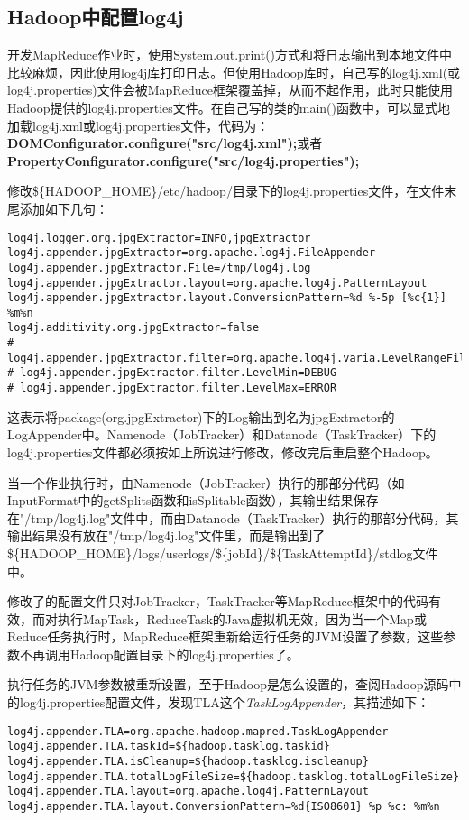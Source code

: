 \subsection{Hadoop中配置log4j}
开发MapReduce作业时，使用System.out.print()方式和将日志输出到本地文件中比较麻烦，因此使用log4j库打印日志。但使用Hadoop库时，自己写的log4j.xml(或log4j.properties)文件会被MapReduce框架覆盖掉，从而不起作用，此时只能使用Hadoop提供的log4j.properties文件。在自己写的类的main()函数中，可以显式地加载log4j.xml或log4j.properties文件，代码为：\textbf{DOMConfigurator.configure("src/log4j.xml");}或者\textbf{PropertyConfigurator.configure("src/log4j.properties");}
\par 修改\$\{HADOOP\_HOME\}/etc/hadoop/目录下的log4j.properties文件，在文件末尾添加如下几句：
\begin{verbatim}
log4j.logger.org.jpgExtractor=INFO,jpgExtractor
log4j.appender.jpgExtractor=org.apache.log4j.FileAppender
log4j.appender.jpgExtractor.File=/tmp/log4j.log
log4j.appender.jpgExtractor.layout=org.apache.log4j.PatternLayout
log4j.appender.jpgExtractor.layout.ConversionPattern=%d %-5p [%c{1}] %m%n
log4j.additivity.org.jpgExtractor=false
# log4j.appender.jpgExtractor.filter=org.apache.log4j.varia.LevelRangeFilter
# log4j.appender.jpgExtractor.filter.LevelMin=DEBUG
# log4j.appender.jpgExtractor.filter.LevelMax=ERROR
\end{verbatim}
\par 这表示将package(org.jpgExtractor)下的Log输出到名为jpgExtractor的LogAppender中。Namenode（JobTracker）和Datanode（TaskTracker）下的log4j.properties文件都必须按如上所说进行修改，修改完后重启整个Hadoop。
\par 当一个作业执行时，由Namenode（JobTracker）执行的那部分代码（如InputFormat中的getSplits函数和isSplitable函数），其输出结果保存在"/tmp/log4j.log"文件中，而由Datanode（TaskTracker）执行的那部分代码，其输出结果没有放在"/tmp/log4j.log"文件里，而是输出到了\$\{HADOOP\_HOME\}/logs/userlogs/\$\{jobId\}/\$\{TaskAttemptId\}/stdlog文件中。
\par 修改了的配置文件只对JobTracker，TaskTracker等MapReduce框架中的代码有效，而对执行MapTask，ReduceTask的Java虚拟机无效，因为当一个Map或Reduce任务执行时，MapReduce框架重新给运行任务的JVM设置了参数，这些参数不再调用Hadoop配置目录下的log4j.properties了。
\par 执行任务的JVM参数被重新设置，至于Hadoop是怎么设置的，查阅Hadoop源码中的log4j.properties配置文件，发现TLA这个\textsl{TaskLogAppender}，其描述如下：
\begin{verbatim}
log4j.appender.TLA=org.apache.hadoop.mapred.TaskLogAppender
log4j.appender.TLA.taskId=${hadoop.tasklog.taskid}
log4j.appender.TLA.isCleanup=${hadoop.tasklog.iscleanup}
log4j.appender.TLA.totalLogFileSize=${hadoop.tasklog.totalLogFileSize}
log4j.appender.TLA.layout=org.apache.log4j.PatternLayout
log4j.appender.TLA.layout.ConversionPattern=%d{ISO8601} %p %c: %m%n
\end{verbatim}
